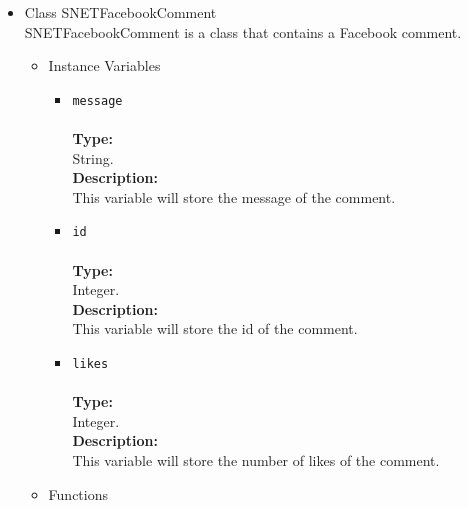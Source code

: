 \begin{itemize}
\begin{itemize}
\begin{itemize}
\end{itemize} %
\end{itemize} %

\item Class SNETFacebookComment\\
\label{sec-1-4-2-5}%
SNETFacebookComment is a class that contains a Facebook comment.
   
\begin{itemize}

\item Instance Variables
\label{sec-1-4-2-5-1}%
\begin{itemize}
\item \verb~message~\\\\
\textbf{Type:}\\
     String.\\

     \textbf{Description:}\\
     This variable will store the message of the comment.\\
\item \verb~id~\\\\
\textbf{Type:}\\
     Integer.\\

     \textbf{Description:}\\
     This variable will store the id of the comment.\\
\item \verb~likes~\\\\
\textbf{Type:}\\
     Integer.\\

     \textbf{Description:}\\
     This variable will store the number of likes of the comment.
\end{itemize}


\item Functions
\label{sec-1-4-2-5-2}%
\begin{itemize}


\end{itemize}
\end{itemize}
\end{itemize}
